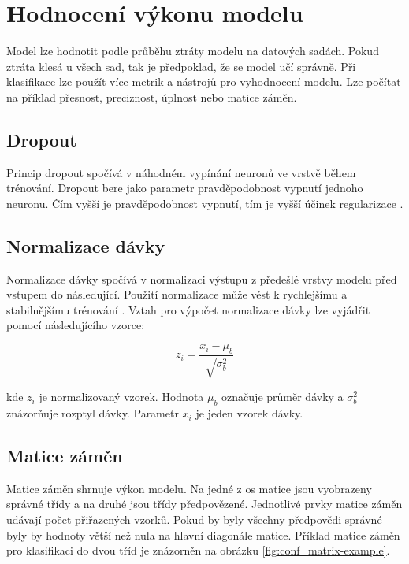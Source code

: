 \documentclass[FM,BP]{tulthesis}
\begin{document}
\section{Hodnocení výkonu modelu}
Model lze hodnotit podle průběhu ztráty modelu na datových sadách. Pokud ztráta klesá u všech sad, tak je předpoklad, že se model učí správně. Při klasifikace lze použít více metrik a nástrojů pro vyhodnocení modelu. Lze počítat na příklad přesnost, preciznost, úplnost nebo matice záměn.

\subsection{Dropout}
Princip dropout spočívá v náhodném vypínání neuronů ve vrstvě během trénování. Dropout bere jako parametr pravděpodobnost vypnutí jednoho neuronu. Čím vyšší je pravděpodobnost vypnutí, tím je vyšší účinek regularizace \cite{burkov2019hundred}.

\subsection{Normalizace dávky}
Normalizace dávky spočívá v normalizaci výstupu z předešlé vrstvy modelu před vstupem do následující. Použití normalizace může vést k rychlejšímu a stabilnějšímu trénování \cite{burkov2019hundred}. Vztah pro výpočet normalizace dávky lze vyjádřit pomocí následujícího vzorce:

\begin{equation}
\label{eqn:batch_mean}
z_i = \frac{x_i - \mu_b}{\sqrt{\sigma^2_b}}
\end{equation}

kde $ z_i $ je normalizovaný vzorek. Hodnota $ \mu_b $ označuje průměr dávky a $ \sigma^2_b $ znázorňuje rozptyl dávky. Parametr $ x_i $ je jeden vzorek dávky.

\subsection{Matice záměn}
Matice záměn shrnuje výkon modelu. Na jedné z os matice jsou vyobrazeny správné třídy a na druhé jsou třídy předpovězené. Jednotlivé prvky matice záměn udávají počet přiřazených vzorků. Pokud by byly všechny předpovědi správné byly by hodnoty větší než nula na hlavní diagonále matice. Příklad matice záměn pro klasifikaci do dvou tříd je znázorněn na obrázku \ref{fig:conf_matrix-example}.
\end{document}
